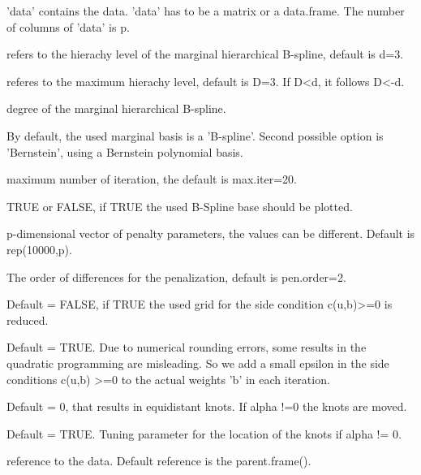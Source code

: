 \documentclass[a4paper]{book}
\begin{document}
%
\begin{Arguments}
\begin{ldescription}
\item[\code{data}] 'data' contains the data. 'data' has to be a matrix or a
data.frame. The number of columns of 'data' is p.
\item[\code{d}] refers to the hierachy level of the marginal hierarchical
B-spline, default is d=3.
\item[\code{D}] referes to the maximum hierachy level, default is D=3. If
D<d, it follows D<-d.
\item[\code{q}] degree of the marginal hierarchical B-spline.
\item[\code{base}] By default, the used marginal basis is a
'B-spline'. Second possible option is 'Bernstein', using a Bernstein
polynomial basis.
\item[\code{max.iter}] maximum number of iteration, the default is max.iter=20.
\item[\code{plot.bsp}] TRUE or FALSE, if TRUE the used B-Spline base should
be plotted.
\item[\code{lambda}] p-dimensional vector of penalty parameters, the values
can be different. Default is rep(10000,p).
\item[\code{pen.order}] The order of differences for the penalization,
default is pen.order=2.
\item[\code{adapt.grid}] Default = FALSE, if TRUE the used grid for the side
condition c(u,b)>=0 is reduced.
\item[\code{add}] Default = TRUE. Due to numerical rounding errors, some
results in the quadratic programming are misleading. So we add a
small epsilon in the side conditions c(u,b) >=0 to the actual weights 'b' in each iteration.
\item[\code{alpha}] Default = 0, that results in equidistant knots. If alpha
!=0 the knots are moved.
\item[\code{symmetric}] Default = TRUE. Tuning parameter for the location of
the knots if alpha != 0.
\item[\code{data.frame}] reference to the data. Default reference is the parent.frame().
\end{ldescription}
\end{Arguments}
%
\end{document}
